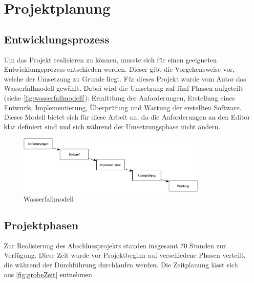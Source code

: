 \section{Projektplanung}

\subsection{Entwicklungsprozess}

Um das Projekt realisieren zu können, musste sich für einen geeigneten Entwicklungsprozess entschieden werden. Dieser gibt die Vorgehensweise vor, welche der Umsetzung zu Grunde liegt. Für dieses Projekt wurde vom Autor das Wasserfallmodell gewählt. Dabei wird die Umsetzung auf fünf Phasen aufgeteilt (siehe \autoref{fig:wasserfallmodell}): Ermittlung der Anforderungen,  Erstellung eines Entwurfs, Implementierung, Überprüfung und Wartung der erstellten Software. Dieses Modell bietet sich für diese Arbeit an, da die Anforderungen an den Editor klar definiert sind und sich während der Umsetzungsphase nicht ändern.

\begin{figure}[H]
	\centering
	\includegraphics[height=110px]{../graphic/diagrams/SD_Wasserfallmodell/Wasserfallmodell}
	\caption{Wasserfallmodell}
	\label{fig:wasserfallmodell}
\end{figure}

\subsection{Projektphasen}
\label{Projektphasen}

Zur Realisierung des Abschlussprojekts standen insgesamt 70 Stunden zur Verfügung. Diese Zeit wurde vor Projektbeginn auf verschiedene Phasen verteilt, die während der Durchführung durchlaufen werden. Die Zeitplanung lässt sich aus \autoref{fig:grobeZeit} entnehmen.

